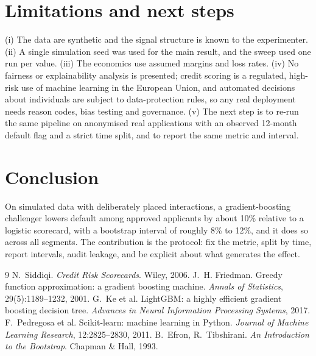 \documentclass[10pt,a4paper]{article}
\begin{document}
\section{Limitations and next steps}
(i) The data are synthetic and the signal structure is known to the experimenter. (ii) A single simulation seed was used for the main result, and the sweep used one run per value. (iii) The economics use assumed margins and loss rates. (iv) No fairness or explainability analysis is presented; credit scoring is a regulated, high-risk use of machine learning in the European Union, and automated decisions about individuals are subject to data-protection rules, so any real deployment needs reason codes, bias testing and governance. (v) The next step is to re-run the same pipeline on anonymised real applications with an observed 12-month default flag and a strict time split, and to report the same metric and interval.

\section{Conclusion}
On simulated data with deliberately placed interactions, a gradient-boosting challenger lowers default among approved applicants by about 10\% relative to a logistic scorecard, with a bootstrap interval of roughly 8\% to 12\%, and it does so across all segments. The contribution is the protocol: fix the metric, split by time, report intervals, audit leakage, and be explicit about what generates the effect.

\begin{thebibliography}{9}
 N.~Siddiqi. \emph{Credit Risk Scorecards}. Wiley, 2006.
 J.~H. Friedman. Greedy function approximation: a gradient boosting machine. \emph{Annals of Statistics}, 29(5):1189--1232, 2001.
 G.~Ke et al. LightGBM: a highly efficient gradient boosting decision tree. \emph{Advances in Neural Information Processing Systems}, 2017.
 F.~Pedregosa et al. Scikit-learn: machine learning in Python. \emph{Journal of Machine Learning Research}, 12:2825--2830, 2011.
 B.~Efron, R.~Tibshirani. \emph{An Introduction to the Bootstrap}. Chapman \& Hall, 1993.
\end{thebibliography}
\end{document}
